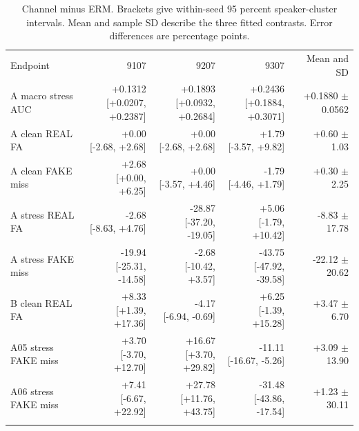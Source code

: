 \begin{table}[t]
\centering
\small
\setlength{\tabcolsep}{3pt}
\caption{Channel minus ERM. Brackets give within-seed 95 percent speaker-cluster intervals. Mean and sample SD describe the three fitted contrasts. Error differences are percentage points.}\label{tab:uncertainty}
\begin{tabular}{@{}lrrrr@{}}
\toprule
Endpoint & 9107 & 9207 & 9307 & Mean and SD \\
\colrule
A macro stress AUC & \shortstack[r]{+0.1312\\{[+0.0207, +0.2387]}} & \shortstack[r]{+0.1893\\{[+0.0932, +0.2684]}} & \shortstack[r]{+0.2436\\{[+0.1884, +0.3071]}} & +0.1880 $\pm$ 0.0562 \\
A clean REAL FA & \shortstack[r]{+0.00\\{[-2.68, +2.68]}} & \shortstack[r]{+0.00\\{[-2.68, +2.68]}} & \shortstack[r]{+1.79\\{[-3.57, +9.82]}} & +0.60 $\pm$ 1.03 \\
A clean FAKE miss & \shortstack[r]{+2.68\\{[+0.00, +6.25]}} & \shortstack[r]{+0.00\\{[-3.57, +4.46]}} & \shortstack[r]{-1.79\\{[-4.46, +1.79]}} & +0.30 $\pm$ 2.25 \\
A stress REAL FA & \shortstack[r]{-2.68\\{[-8.63, +4.76]}} & \shortstack[r]{-28.87\\{[-37.20, -19.05]}} & \shortstack[r]{+5.06\\{[-1.79, +10.42]}} & -8.83 $\pm$ 17.78 \\
A stress FAKE miss & \shortstack[r]{-19.94\\{[-25.31, -14.58]}} & \shortstack[r]{-2.68\\{[-10.42, +3.57]}} & \shortstack[r]{-43.75\\{[-47.92, -39.58]}} & -22.12 $\pm$ 20.62 \\
B clean REAL FA & \shortstack[r]{+8.33\\{[+1.39, +17.36]}} & \shortstack[r]{-4.17\\{[-6.94, -0.69]}} & \shortstack[r]{+6.25\\{[-1.39, +15.28]}} & +3.47 $\pm$ 6.70 \\
A05 stress FAKE miss & \shortstack[r]{+3.70\\{[-3.70, +12.70]}} & \shortstack[r]{+16.67\\{[+3.70, +29.82]}} & \shortstack[r]{-11.11\\{[-16.67, -5.26]}} & +3.09 $\pm$ 13.90 \\
A06 stress FAKE miss & \shortstack[r]{+7.41\\{[-6.67, +22.92]}} & \shortstack[r]{+27.78\\{[+11.76, +43.75]}} & \shortstack[r]{-31.48\\{[-43.86, -17.54]}} & +1.23 $\pm$ 30.11 \\
\botrule
\end{tabular}
\end{table}

